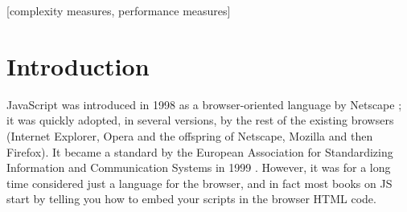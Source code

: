 \documentclass{sig-alternate}
\begin{document}
\maketitle
\begin{abstract}After almost fifteen years, JavaScript has finally risen as a popular
language for implementing all kind of applications, from server-based
to rich Internet Applications. Its features are interesting for
implementing evolutionary algorithm frameworks 
that encompass both
tiers, but, besides, they allow a change in paradigm that goes beyond
the canonical evolutionary algorithm. 
In this paper we will experiment
with different architectures
implementations and evolutionary
algorithms to assess which ones offers most advantages in terms of
performance, scalability and ease of use 
for the computer scientist. All implementations  have been released as open source.
\end{abstract}

[complexity measures, performance measures]


\section{Introduction}

JavaScript was introduced in 1998 as a browser-oriented language by
Netscape \cite{flanagan1998javascript}; it was quickly adopted, in
several versions, by the rest of the existing browsers (Internet
Explorer, Opera and the offspring of Netscape, Mozilla and then
Firefox). It became a standard by the European Association for
Standardizing Information and Communication Systems in 1999
\cite{ecma1999262}. However, it was for a long time considered just a
language for the browser, and in fact most books on JS
\cite{goodman2007javascript} start by
telling you how to embed your scripts in the browser HTML code.
\end{document}

